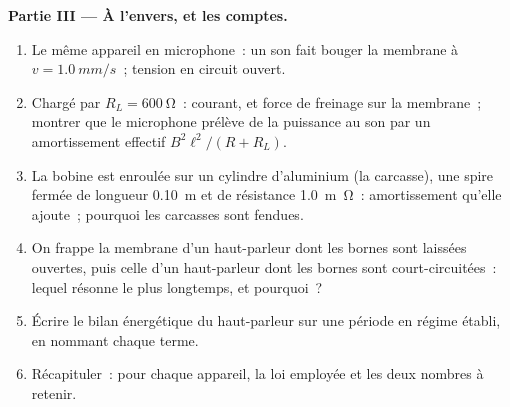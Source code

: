 \begin{problem}
\medskip
\noindent\textbf{Partie III --- À l'envers, et les comptes.}
\begin{enumerate}[resume]
  \item Le même appareil en microphone~: un son fait bouger la membrane à
        $v = \qty{1.0}{mm/s}$~; tension en circuit ouvert.
  \item Chargé par $R_L = \qty{600}{\ohm}$~: courant, et force de freinage sur
        la membrane~; montrer que le microphone prélève de la puissance au son
        par un amortissement effectif $B^2\ell^2/(R + R_L)$.
  \item La bobine est enroulée sur un cylindre d'aluminium (la carcasse), une
        spire fermée de longueur \qty{0.10}{m} et de résistance \qty{1.0}{m\ohm}~:
        amortissement qu'elle ajoute~; pourquoi les carcasses sont fendues.
  \item On frappe la membrane d'un haut-parleur dont les bornes sont laissées
        ouvertes, puis celle d'un haut-parleur dont les bornes sont
        court-circuitées~: lequel résonne le plus longtemps, et pourquoi~?
  \item Écrire le bilan énergétique du haut-parleur sur une période en régime
        établi, en nommant chaque terme.
  \item Récapituler~: pour chaque appareil, la loi employée et les deux
        nombres à retenir.
\end{enumerate}
\end{problem}
